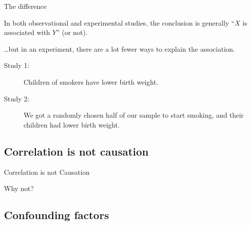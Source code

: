 %
\begin{frame}{The difference}

  In \alert{both} observational and experimental studies,
  the conclusion is generally ``$X$ is associated with $Y$'' (or not).

  \vspace{2em}

  \ldots but in an \alert{experiment},
  there are a lot fewer ways to explain the association.

  \vspace{2em}

  \begin{description}
      \item[Study 1:] Children of smokers have lower birth weight.
      \item[Study 2:] We got a randomly chosen half of our sample to start smoking,
          and their children had lower birth weight.
  \end{description}

\end{frame}


\subsection{Correlation is not causation}

%
\begin{frame}{Correlation is not Causation}

  \begin{center}

  \end{center}

  \vspace{2em}

  \alert{Why not?}

\end{frame}

\subsection{Confounding factors}

